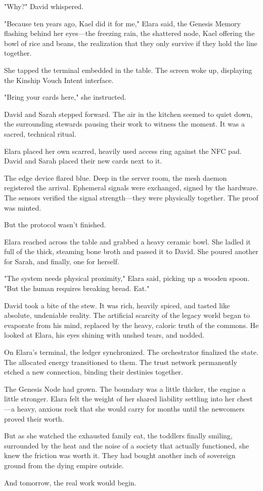 "Why?" David whispered. 

"Because ten years ago, Kael did it for me," Elara said, the Genesis Memory flashing behind her eyes—the freezing rain, the shattered node, Kael offering the bowl of rice and beans, the realization that they only survive if they hold the line together. 

She tapped the terminal embedded in the table. The screen woke up, displaying the Kinship Vouch Intent interface. 

"Bring your cards here," she instructed. 

David and Sarah stepped forward. The air in the kitchen seemed to quiet down, the surrounding stewards pausing their work to witness the moment. It was a sacred, technical ritual. 

Elara placed her own scarred, heavily used access ring against the NFC pad. David and Sarah placed their new cards next to it. 

The edge device flared blue. Deep in the server room, the mesh daemon registered the arrival. Ephemeral signals were exchanged, signed by the hardware. The sensors verified the signal strength—they were physically together. The proof was minted. 

But the protocol wasn't finished. 

Elara reached across the table and grabbed a heavy ceramic bowl. She ladled it full of the thick, steaming bone broth and passed it to David. She poured another for Sarah, and finally, one for herself. 

"The system needs physical proximity," Elara said, picking up a wooden spoon. "But the human requires breaking bread. Eat."

David took a bite of the stew. It was rich, heavily spiced, and tasted like absolute, undeniable reality. The artificial scarcity of the legacy world began to evaporate from his mind, replaced by the heavy, caloric truth of the commons. He looked at Elara, his eyes shining with unshed tears, and nodded.

On Elara's terminal, the ledger synchronized. The orchestrator finalized the state. The allocated energy transitioned to them. The trust network permanently etched a new connection, binding their destinies together.

The Genesis Node had grown. The boundary was a little thicker, the engine a little stronger. Elara felt the weight of her shared liability settling into her chest—a heavy, anxious rock that she would carry for months until the newcomers proved their worth. 

But as she watched the exhausted family eat, the toddlers finally smiling, surrounded by the heat and the noise of a society that actually functioned, she knew the friction was worth it. They had bought another inch of sovereign ground from the dying empire outside. 

And tomorrow, the real work would begin.
